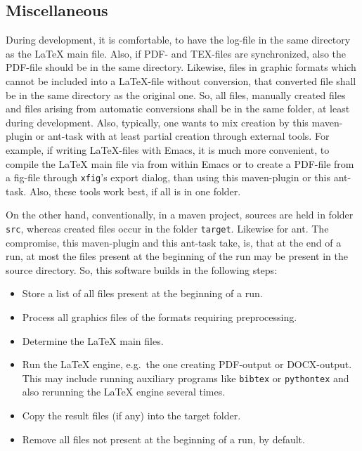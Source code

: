 \subsection{Miscellaneous}



During development, it is comfortable, 
to have the log-file in the same directory as the \LaTeX{} main file. 
Also, if PDF- and TEX-files are synchronized, 
also the PDF-file should be in the same directory. 
Likewise, files in graphic formats 
which cannot be included into a \LaTeX-file without conversion, 
that converted file shall be in the same directory as the original one. 
So, all files, manually created files 
and files arising from automatic conversions 
shall be in the same folder, at least during development. 
Also, typically, one wants to mix creation by this maven-plugin or ant-task 
with at least partial creation through external tools. 
For example, if writing \LaTeX-files with Emacs, 
it is much more convenient, to compile the \LaTeX{} main file 
via \pdflatex{} from within Emacs 
or to create a PDF-file from a \gls{fig}-file 
through \texttt{xfig}'s export dialog, 
than using this maven-plugin or this ant-task. 
Also, these tools work best, if all is in one folder. 

On the other hand, 
conventionally, in a maven project, 
sources are held in folder \texttt{src}, 
whereas created files occur in the folder \texttt{target}. 
Likewise for ant. 
The compromise, this maven-plugin and this ant-task take, 
is, that at the end of a run, 
at most the files present at the beginning of the run 
may be present in the source directory. 
So, this software builds in the following steps: 
%
\begin{itemize}
\item
Store a list of all files present at the beginning of a run.
\item
Process all graphics files of the formats requiring preprocessing.
\item
Determine the \LaTeX{} main files.
\item
Run the \LaTeX{} engine, e.g.~the one creating PDF-output or DOCX-output.
This may include running auxiliary programs like \texttt{bibtex} or \texttt{pythontex} 
and also rerunning the \LaTeX{} engine several times. 
\item
Copy the result files (if any) into the target folder.
\item
Remove all files not present at the beginning of a run, by default. 
\end{itemize}

